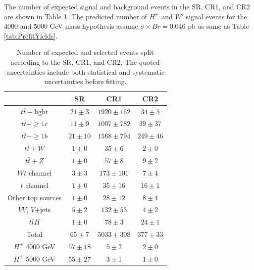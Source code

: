The number of expected signal and background events in the SR, CR1, and CR2 are shown in Table \ref{tab:PrefitYieldsAbove3TeV}. The predicted number of $H^{+}$ and $W'$ signal events for the 4000 and 5000 GeV mass hypothesis assume $\sigma \times Br = 0.046$ pb as same as Table \ref{tab:PrefitYields}.

\begin{table}[H]
  \centering
  \begin{tabular*}{130mm}{@{\extracolsep{\fill}}cccc}
    \hline\hline
                            & SR           & CR1             & CR2\\
    \hline
    $t\bar{t}+\text{light}$ & $21 \pm  3$  & $1920 \pm 162$  & $ 34 \pm  5$\\
    $t\bar{t}+\geq1c$       & $11 \pm  9$  & $1007 \pm 782$  & $ 39 \pm 37$\\
    $t\bar{t}+\geq1b$       & $21 \pm 10$  & $1568 \pm 794$  & $249 \pm 46$\\
    $t\bar{t}+W$            & $ 1 \pm  0$  & $  35 \pm   6$  & $  2 \pm  0$\\
    $t\bar{t}+Z$            & $ 1 \pm  0$  & $  57 \pm   8$  & $  9 \pm  2$\\
    $Wt$ channel            & $ 3 \pm  3$  & $ 173 \pm 101$  & $  7 \pm  4$\\
    $t$ channel             & $ 1 \pm  0$  & $  35 \pm  16$  & $ 16 \pm  1$\\
    Other top sources       & $ 1 \pm  0$  & $  28 \pm  12$  & $  8 \pm  4$\\
    $VV$, $V$+jets          & $ 5 \pm  2$  & $ 132 \pm  53$  & $  4 \pm  2$\\
    $t\bar{t}H$             & $ 1 \pm  0$  & $  78 \pm   3$  & $ 24 \pm  1$\\
    \hline
    Total                   & $65 \pm  7$  & $5033 \pm 308$  & $377 \pm 33$\\
    \hline
    $H^{+}$ 4000 GeV        & $57 \pm 18$  & $   5 \pm   2$  & $  2 \pm  0$\\
    $H^{+}$ 5000 GeV        & $55 \pm 27$  & $   3 \pm   1$  & $  1 \pm  0$\\
    \hline\hline
  \end{tabular*}
  \caption{Number of expected and selected events split according to the SR, CR1, and CR2. The quoted uncertainties include both statistical and systematic uncertainties before fitting.}
  \label{tab:PrefitYieldsAbove3TeV}
\end{table}